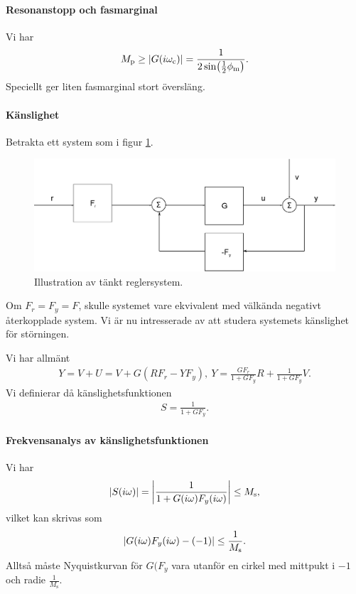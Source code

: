\paragraph{Resonanstopp och fasmarginal}
Vi har
\begin{align*}
	M_{\text{p}} \geq \abs{G(i\omega_{\text{c}})} = \frac{1}{2\sin(\frac{1}{2}\phi_{\text{m}})}.
\end{align*}
Speciellt ger liten fasmarginal stort översläng.

\paragraph{Känslighet}
Betrakta ett system som i figur \ref{fig:negative_feedback_equiv}.
\begin{figure}[!ht]
	\centering
	\includegraphics[width = \textwidth]{./Images/negative_feedback_equiv.eps}
	\caption{Illustration av tänkt reglersystem.}
	\label{fig:negative_feedback_equiv}
\end{figure}
Om $F_{r} = F_{y} = F$, skulle systemet vare ekvivalent med välkända negativt återkopplade system. Vi är nu intresserade av att studera systemets känslighet för störningen.

Vi har allmänt
\begin{align*}
	Y = V + U = V + G(RF_{r} - YF_{y}),\ Y = \frac{GF_{r}}{1 + GF_{y}}R + \frac{1}{1 + GF_{y}}V.
\end{align*}
Vi definierar då känslighetsfunktionen
\begin{align*}
	S = \frac{1}{1 + GF_{y}}.
\end{align*}

\paragraph{Frekvensanalys av känslighetsfunktionen}
Vi har
\begin{align*}
	\abs{S(i\omega)} = \abs{\frac{1}{1 + G(i\omega)F_{y}(i\omega)}} \leq M_{\text{s}},
\end{align*}
vilket kan skrivas som
\begin{align*}
	\abs{G(i\omega)F_{y}(i\omega) - (-1)} \leq \frac{1}{M_{\text{s}}}.
\end{align*}
Alltså måste Nyquistkurvan för $G(F_{y}$ vara utanför en cirkel med mittpukt i $-1$ och radie $\frac{1}{M_{\text{s}}}$.

